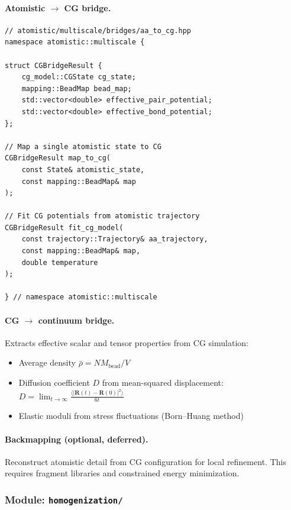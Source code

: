 \documentclass[11pt]{article}
\begin{document}
\paragraph{Atomistic $\to$ CG bridge.}

\begin{lstlisting}
// atomistic/multiscale/bridges/aa_to_cg.hpp
namespace atomistic::multiscale {

struct CGBridgeResult {
    cg_model::CGState cg_state;
    mapping::BeadMap bead_map;
    std::vector<double> effective_pair_potential;
    std::vector<double> effective_bond_potential;
};

// Map a single atomistic state to CG
CGBridgeResult map_to_cg(
    const State& atomistic_state,
    const mapping::BeadMap& map
);

// Fit CG potentials from atomistic trajectory
CGBridgeResult fit_cg_model(
    const trajectory::Trajectory& aa_trajectory,
    const mapping::BeadMap& map,
    double temperature
);

} // namespace atomistic::multiscale
\end{lstlisting}

\paragraph{CG $\to$ continuum bridge.}

Extracts effective scalar and tensor properties from CG simulation:

\begin{itemize}
  \item Average density $\bar{\rho} = N M_\text{bead} / V$
  \item Diffusion coefficient $D$ from mean-squared displacement:
        $D = \lim_{t \to \infty} \frac{\langle |\mathbf{R}(t) - \mathbf{R}(0)|^2 \rangle}{6t}$
  \item Elastic moduli from stress fluctuations (Born--Huang method)
\end{itemize}

\paragraph{Backmapping (optional, deferred).}

Reconstruct atomistic detail from CG configuration for local refinement.
This requires fragment libraries and constrained energy minimization.

\subsubsection{Module: \texttt{homogenization/}}
\end{document}

